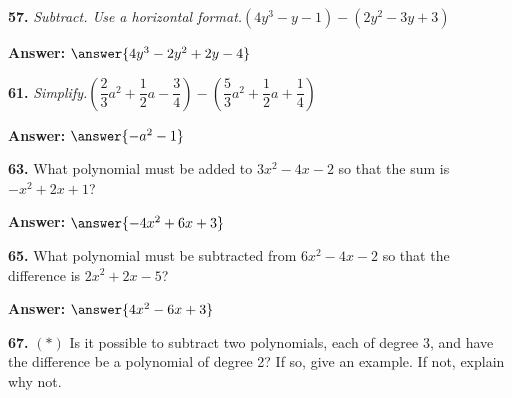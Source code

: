 \documentclass{ximera}
\begin{document}
\begin{problem}
\textbf{57.} \emph{Subtract. Use a horizontal format.}\quad $(4y^3 - y - 1) - (2y^2 - 3y + 3)$

\textbf{Answer:} $\answer{4y^3 -2y^2 +2y -4}$
\end{problem}

\begin{problem}
\textbf{61.} \emph{Simplify.}\quad $\left(\dfrac{2}{3}a^2 + \dfrac{1}{2}a - \dfrac{3}{4}\right)
       - \left(\dfrac{5}{3}a^2 + \dfrac{1}{2}a + \dfrac{1}{4}\right)$

\textbf{Answer:} $\answer{-a^2 -1}$
\end{problem}

\begin{problem}
\textbf{63.} What polynomial must be added to $3x^2 - 4x - 2$ so that the sum is
  $-x^2 + 2x + 1$?

\textbf{Answer:} $\answer{-4x^2 +6x +3}$
\end{problem}

\begin{problem}
\textbf{65.} What polynomial must be subtracted from $6x^2 - 4x - 2$ so that the difference is
  $2x^2 + 2x - 5$?

\textbf{Answer:} $\answer{4x^2 -6x +3}$
\end{problem}

\begin{problem}
\textbf{67.} $(*)$ Is it possible to subtract two polynomials, each of degree 3, and have the
  difference be a polynomial of degree 2? If so, give an example. If not, explain why not.

\begin{multipleChoice} 
\end{multipleChoice}
\end{problem}
\end{document}
